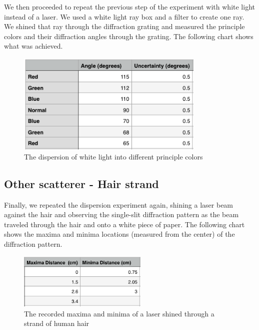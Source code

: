 \documentclass{article}
\begin{document}
We then proceeded to repeat the previous step of the experiment with white light
instead of a laser. We used a white light ray box and a filter to create one
ray. We shined that ray through the diffraction grating and measured the
principle colors and their diffraction angles through the grating. The following
chart shows what was achieved.

\begin{figure}[H]
    \centering
    \includegraphics[width=0.8\textwidth]{charts/dispersion-white-light}
    \caption{The dispersion of white light into different principle colors}
    \label{dispersion-white-light}
\end{figure}

\subsection{Other scatterer - Hair strand}

Finally, we repeated the dispersion experiment again, shining a laser beam
against the hair and observing the single-slit diffraction pattern as the beam
traveled through the hair and onto a white piece of paper. The following chart
shows the maxima and minima locations (measured from the center) of the
diffraction pattern.

\begin{figure}[H]
    \centering
    \includegraphics[width=0.55\textwidth]{charts/human-hair}
    \caption{The recorded maxima and minima of a laser shined through a strand
    of human hair}
    \label{human-hair}
\end{figure}
\end{document}
